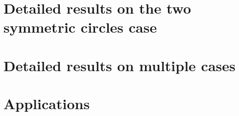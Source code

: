 \documentclass[
 hidempi, 
]{mpi2015-cscpreprint}
\begin{document}
\maketitle
\tableofcontents






\appendix

\section{Detailed results on the two symmetric circles case}\label{app:1a}


\section{Detailed results on multiple cases}\label{app:all}


\section{Applications}\label{app:applications}

\end{document}
